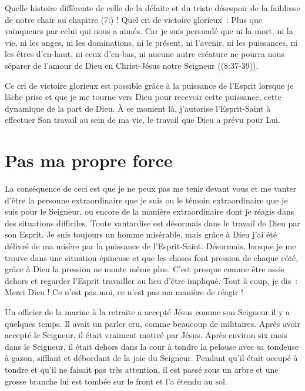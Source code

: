 Quelle histoire différente de celle de la défaite et du triste désespoir
 de la faiblesse de notre chair au chapitre (7:) !
 Quel cri de victoire glorieux~:
 \og Plus que vainqueurs par celui qui nous a aimés.
 Car je suis persuadé que ni la mort, ni la vie, ni les anges,
 ni les dominations, ni le présent, ni l'avenir, ni les puissances,
 ni les êtres d'en-haut, ni ceux d'en-bas, ni aucune autre créature
 ne pourra nous séparer de l'amour de Dieu en Christ-Jésus
 notre Seigneur \fg{} ((8:37-39)).

Ce cri de victoire glorieux est possible grâce à la puissance de l'Es\-prit
 lorsque je lâche prise et que je me tourne vers Dieu pour recevoir
 cette puissance, cette dynamique de la part de Dieu. À ce moment là,
 j'autorise l'Esprit-Saint à effectuer Son travail au sein de ma vie,
 le travail que Dieu a prévu pour Lui.


\section{Pas ma propre force}

La conséquence de ceci est que je ne peux pas me tenir devant vous
 et me vanter d'être la personne extraordinaire que je suis
 ou le témoin extraordinaire que je suis pour le Seigneur,
 ou encore de la manière extraordinaire dont je réagis dans des
 situations difficiles.
 Toute vantardise est désormais dans le travail de Dieu par son Esprit.
 Je suis toujours un homme misérable, mais grâce à Dieu
 j'ai été délivré de ma misère par la puissance de l'Esprit-Saint.
 Désormais, lorsque je me trouve dans une situation épineuse
 et que les choses font pression de chaque côté, grâce à Dieu la pression
 ne monte même plus.
 C'est presque comme être assis dehors et regarder l'Esprit travailler
 au lieu d'être impliqué.
 Tout à coup, je dis~:
 \og Merci Dieu ! Ce n'est pas moi,
 ce n'est pas ma manière de réagir ! \fg{}

Un officier de la marine à la retraite a accepté Jésus comme son Seigneur
 il y a quelques temps.
 Il avait un parler cru, comme beaucoup de militaires.
 Après avoir accepté le Seigneur, il était vraiment motivé par Jésus.
 Après environ six mois dans le Seigneur, il était dehors dans la cour
 à tondre la pelouse avec sa tondeuse à gazon, sifflant et débordant
 de la joie du Seigneur.
 Pendant qu'il était occupé à tondre et qu'il ne faisait pas très attention,
 il est passé sous un arbre et une grosse branche lui est tombée sur le front
 et l'a étendu au sol.

